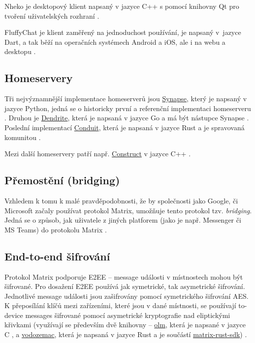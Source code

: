 Nheko je desktopový klient napsaný v jazyce C++ s pomocí knihovny Qt pro tvoření
uživatelských rozhraní \cite{GitHub-Nheko}.

FluffyChat je klient zaměřený na jednoduchost používání, je napsaný v~jazyce
Dart, a tak běží na operačních systémech Android a iOS, ale i na webu a
desktopu \cite{FluffyChat-Homepage,GitLab-FluffyChat}.

\subsection{Homeservery}

Tři nejvýznamnější implementace homeserverů jsou
\href{https://github.com/matrix-org/synapse/}{Synapse}, který je napsaný v
jazyce Python, jedná se o historicky první a referenční implementaci homeserveru
\cite{GitHub-Synapse}. Druhou je
\href{https://github.com/matrix-org/dendrite/}{Dendrite}, která je napsaná v
jazyce Go a má být nástupce Synapse \cite{GitHub-Dendrite}. Poslední implementací
\href{https://github.com/timokoesters/conduit}{Conduit}, která je napsaná v
jazyce Rust a je spravovaná komunitou \cite{GitHub-Conduit}.

Mezi další homeservery patří např.
\href{https://github.com/matrix-construct/construct}{Construct} v jazyce C++
\cite{GitHub-Construct}.

\subsection{Přemostění (bridging)}

Vzhledem k tomu k malé pravděpodobnosti, že by společnosti jako Google, či
Microsoft začaly používat protokol Matrix, umožňuje tento protokol tzv.
\textit{bridging}. Jedná se o způsob, jak  uživatele z jiných
platforem (jako je např. Messenger či MS Teams) do protokolu Matrix
\cite{MatrixORG-Bridges}.

\subsection{End-to-end šifrování}\label{matrix-encryption}

Protokol Matrix podporuje E2EE -- message události v místnostech mohou být
šifrované. Pro dosažení E2EE používá jak symetrické, tak asymetrické šifrování.
Jednotlivé message události jsou zašifrovány pomocí symetrického šifrování AES.
K přeposílání klíčů mezi zařízeními, které jsou v dané místnosti, se používají
to-device messages šifrované pomocí asymetrické kryptografie nad
eliptickými křivkami (využívají se především dvě knihovny --
\href{https://gitlab.matrix.org/matrix-org/olm}{olm}, která je napsané v jazyce
C \cite{GitLab-Olm}, a
\href{https://github.com/matrix-org/vodozemac}{vodozemac}, která je napsaná v
jazyce Rust a je součástí
\href{https://github.com/matrix-org/matrix-rust-sdk}{matrix-rust-sdk})
\cite{GitHub-MatrixRustSDK}.

